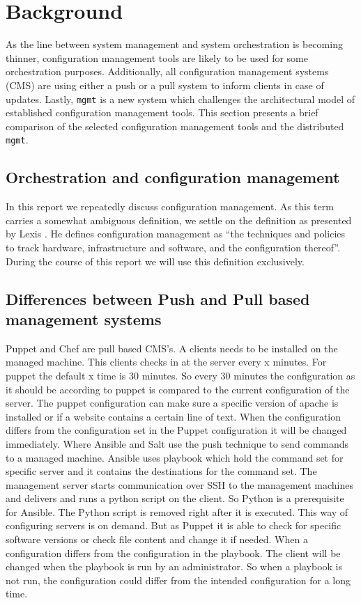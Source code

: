 \section{Background}\label{sec:background}
As the line between system management and system orchestration is becoming thinner, configuration management tools are likely to be used for some orchestration purposes. Additionally, all configuration management systems (CMS) are using either a push or a pull system to inform clients in case of updates. Lastly, \texttt{mgmt} is a new system which challenges the architectural model of established configuration management tools. This section presents a brief comparison of the selected configuration management tools and the distributed \texttt{mgmt}.


\subsection{Orchestration and configuration management}\label{subsec:orchestration}
In this report we repeatedly discuss configuration management. As this term carries a somewhat ambiguous definition, we settle on the definition as presented by Lexis \cite{}. He defines configuration management as ``the techniques and policies to track hardware, infrastructure and software, and the configuration thereof''. During the course of this report we will use this definition exclusively.


\subsection{Differences between Push and Pull based management systems}\label{subsec:pushpull}
Puppet and Chef are pull based CMS's. A clients needs to be installed on the managed machine. This clients checks in at the server every x minutes. For puppet the default x time is 30 minutes. So every 30 minutes the configuration as it should be according to puppet is compared to the current configuration of the server. The puppet configuration can make sure a specific version of apache is installed or if a website contains a certain line of text. When the configuration differs from the configuration set in the Puppet configuration it will be changed immediately. Where Ansible and Salt use the push technique to send commands to a managed machine. Ansible uses playbook which hold the command set for specific server and it contains the destinations for the command set. The management server starts communication over SSH to the management machines and delivers and runs a python script on the client. So Python is a prerequisite for Ansible. The Python script is removed right after it is executed. This way of configuring servers is on demand. But as Puppet it is able to check for specific software versions or check file content and change it if needed. When a configuration differs from the configuration in the playbook. The client will be changed when the playbook is run by an administrator. So when a playbook is not run, the configuration could differ from the intended configuration for a long time. 


